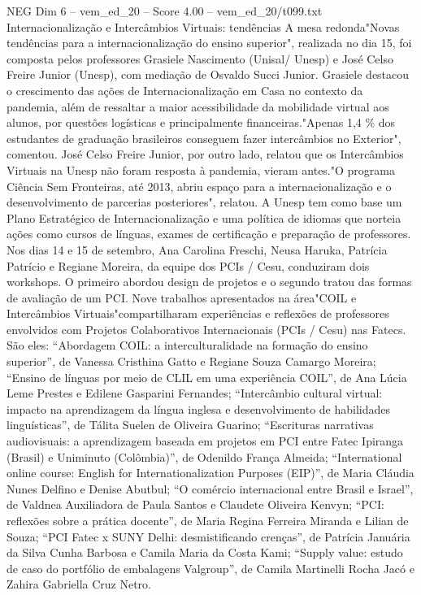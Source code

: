 \begin{textsample}{NEG Dim 6 – vem\_ed\_20 – Score 4.00 – vem\_ed\_20/t099.txt}  \label{ex:f6_neg_134}
Internacionalização e Intercâmbios Virtuais: tendências A mesa redonda"Novas tendências para a internacionalização do ensino superior", realizada no dia 15, foi composta pelos professores Grasiele Nascimento (Unisal/ Unesp) e José Celso Freire Junior (Unesp), com mediação de Osvaldo Succi Junior.
Grasiele destacou o crescimento das ações de Internacionalização em Casa no contexto da pandemia, além de ressaltar a maior acessibilidade da mobilidade virtual aos alunos, por questões logísticas e principalmente financeiras."Apenas 1,4 \% dos estudantes de graduação brasileiros conseguem fazer intercâmbios no Exterior", comentou.
José Celso Freire Junior, por outro lado, relatou que os Intercâmbios Virtuais na Unesp não foram resposta à pandemia, vieram antes."O programa Ciência Sem Fronteiras, até 2013, abriu espaço para a internacionalização e o desenvolvimento de parcerias posteriores", relatou.
A Unesp tem como base um Plano Estratégico de Internacionalização e uma política de idiomas que norteia ações como cursos de línguas, exames de certificação e preparação de professores.
Nos dias 14 e 15 de setembro, Ana Carolina Freschi, Neusa Haruka, Patrícia Patrício e Regiane Moreira, da equipe dos PCIs / Cesu, conduziram dois workshops.
O primeiro abordou design de projetos e o segundo tratou das formas de avaliação de um PCI.
Nove trabalhos apresentados na área"COIL e Intercâmbios Virtuais"compartilharam experiências e reflexões de professores envolvidos com Projetos Colaborativos Internacionais (PCIs / Cesu) nas Fatecs.
São eles: “Abordagem COIL: a interculturalidade na formação do ensino superior”, de Vanessa Cristhina Gatto e Regiane Souza Camargo Moreira; “Ensino de línguas por meio de CLIL em uma experiência COIL”, de Ana Lúcia Leme Prestes e Edilene Gasparini Fernandes; “Intercâmbio cultural virtual: impacto na aprendizagem da língua inglesa e desenvolvimento de habilidades linguísticas”, de Tálita Suelen de Oliveira Guarino; “Escrituras narrativas audiovisuais: a aprendizagem baseada em projetos em PCI entre Fatec Ipiranga (Brasil) e Uniminuto (Colômbia)”, de Odenildo França Almeida; “International online course: English for Internationalization Purposes (EIP)”, de Maria Cláudia Nunes Delfino e Denise Abutbul; “O comércio internacional entre Brasil e Israel”, de Valdnea Auxiliadora de Paula Santos e Claudete Oliveira Kenvyn; “PCI: reflexões sobre a prática docente”, de Maria Regina Ferreira Miranda e Lilian de Souza; “PCI Fatec x SUNY Delhi: desmistificando crenças”, de Patrícia Januária da Silva Cunha Barbosa e Camila Maria da Costa Kami; “Supply value: estudo de caso do portfólio de embalagens Valgroup”, de Camila Martinelli Rocha Jacó e Zahira Gabriella Cruz Netro.

\end{textsample}
